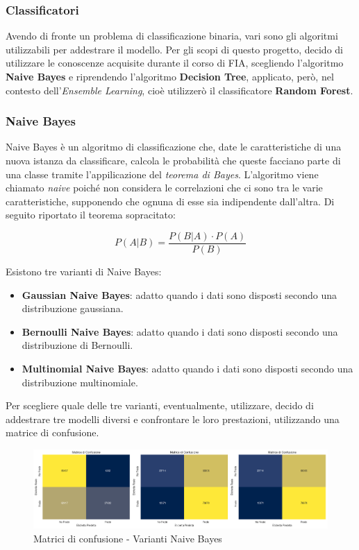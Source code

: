 \documentclass[]{article}
\begin{document}
    \subsubsection{Classificatori}
        Avendo di fronte un problema di classificazione binaria, vari sono gli algoritmi utilizzabili per addestrare il modello. Per gli scopi di questo progetto, decido di utilizzare le conoscenze acquisite durante il corso di FIA, scegliendo l'algoritmo \textbf{Naive Bayes} e riprendendo l'algoritmo \textbf{Decision Tree}, applicato, però, nel contesto dell'\textit{Ensemble Learning}, cioè utilizzerò il classificatore \textbf{Random Forest}.
        \subsubsection{Naive Bayes}
            Naive Bayes è un algoritmo di classificazione che, date le caratteristiche di una nuova istanza da classificare, calcola le probabilità che queste facciano parte di una classe tramite l'appilicazione del \textit{teorema di Bayes}. L'algoritmo viene chiamato \textit{naive} poiché non considera le correlazioni che ci sono tra le varie caratteristiche, supponendo che ognuna di esse sia indipendente dall'altra. Di seguito riportato il teorema sopracitato:
            \begin{center}
            \[
                P(A|B) = \frac{P(B|A) \cdot P(A)}{P(B)}
            \]
        \end{center}
        Esistono tre varianti di Naive Bayes:
        \begin{itemize}
            \item \textbf{Gaussian Naive Bayes}: adatto quando i dati sono disposti secondo una distribuzione gaussiana.
            \item \textbf{Bernoulli Naive Bayes}: adatto quando i dati sono disposti secondo una distribuzione di Bernoulli.
            \item \textbf{Multinomial Naive Bayes}: adatto quando i dati sono disposti secondo una distribuzione multinomiale.
        \end{itemize}
        Per scegliere quale delle tre varianti, eventualmente, utilizzare, decido di addestrare tre modelli diversi e confrontare le loro prestazioni, utilizzando una matrice di confusione.
        \begin{figure}[H]
            \centering
            \includegraphics[width=1\textwidth]{img/ConfrontoMatrici.png}
            \caption[short]{Matrici di confusione - Varianti Naive Bayes}
        \end{figure}
\end{document}
